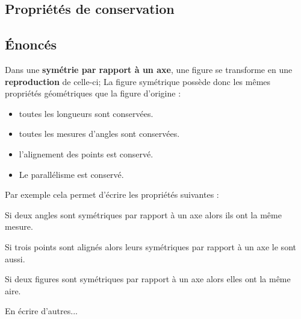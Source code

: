 \begin{changemargin}{0mm}{-15mm}
    \section{Propriétés de conservation}
    \subsection{Énoncés}
    \begin{propriete}
    Dans une \textbf{symétrie par rapport à un axe}, une figure se transforme en une \textbf{reproduction} de celle-ci; La figure symétrique possède donc les mêmes propriétés géométriques que la figure d'origine :
        \begin{itemize}
            \item  toutes les longueurs sont conservées.
            \item  toutes les mesures d'angles sont conservées.
            \item  l'alignement des points est conservé.
            \item  Le parallélisme est conservé.
        \end{itemize}
    \end{propriete}   
    
    Par exemple cela permet d'écrire les propriétés suivantes :

    \begin{propriete}
        Si deux angles sont symétriques par rapport à un axe alors ils ont la même mesure.
    \end{propriete}   
    \begin{propriete}
        Si trois points sont alignés alors leurs symétriques par rapport à un axe le sont aussi.
    \end{propriete}   
    \begin{propriete}
        Si deux figures sont symétriques par rapport à un axe alors elles ont la même aire.
    \end{propriete}   

    En écrire d'autres...

\end{changemargin}
